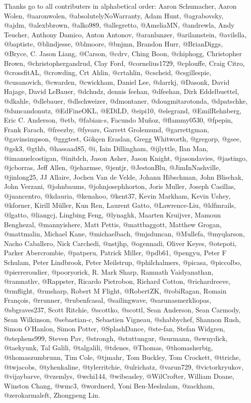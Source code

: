 Thanks go to all contributers in alphabetical order: Aaron Schumacher,
Aaron Wolen, @aaronwolen, @absolutelyNoWarranty, Adam Hunt, @agrabovsky,
@ajdm, @alexbbrown, @alko989, @allegretto, @AmeliaMN, @andrewla, Andy
Teucher, Anthony Damico, Anton Antonov, @aranlunzer, @arilamstein,
@avilella, @baptiste, @blindjesse, @blmoore, @bnjmn, Brandon Hurr,
@BrianDiggs, @Bryce, C. Jason Liang, @Carson, @cdrv, Ching Boon,
@chiphogg, Christopher Brown, @christophergandrud, Clay Ford,
@cornelius1729, @cplouffe, Craig Citro, @crossfitAL, @crowding, Crt
Ahlin, @crtahlin, @cscheid, @csgillespie, @cusanovich, @cwarden,
@cwickham, Daniel Lee, @darrkj, @Dasonk, David Hajage, David LeBauer,
@dchudz, dennis feehan, @dfeehan, Dirk Eddelbuettel, @dkahle, @dlebauer,
@dlschweizer, @dmontaner, @dougmitarotonda, @dpatschke, @duncandonutz,
@EdFineOKL, @EDiLD, @eipi10, @elegrand, @EmilRehnberg, Eric C. Anderson,
@etb, @fabian-s, Facundo Muñoz, @flammy0530, @fpepin, Frank Farach,
@freezby, @fyears, Garrett Grolemund, @garrettgman, @gavinsimpson,
@gggtest, Gökçen Eraslan, Gregg Whitworth, @gregorp, @gsee, @gsk3,
@gthb, @hassaad85, @i, Iain Dillingham, @ijlyttle, Ilan Man,
@imanuelcostigan, @initdch, Jason Asher, Jason Knight, @jasondavies,
@jastingo, @jcborras, Jeff Allen, @jeharmse, @jentjr, @JestonBlu,
@JimInNashville, @jinlong25, JJ Allaire, Jochen Van de Velde, Johann
Hibschman, John Blischak, John Verzani, @johnbaums, @johnjosephhorton,
Joris Muller, Joseph Casillas, @juancentro, @kdauria, @kenahoo, @kent37,
Kevin Markham, Kevin Ushey, @kforner, Kirill Müller, Kun Ren, Laurent
Gatto, @Lawrence-Liu, @ldfmrails, @lgatto, @liangcj, Lingbing Feng,
@lynaghk, Maarten Kruijver, Mamoun Benghezal, @mannyishere, Matt Pettis,
@mattbaggott, Matthew Grogan, @mattmalin, Michael Kane, @michaelbach,
@mjsduncan, @Mullefa, @myqlarson, Nacho Caballero, Nick Carchedi,
@nstjhp, @ogennadi, Oliver Keyes, @otepoti, Parker Abercrombie,
@patperu, Patrick Miller, @pdb61, @pengyu, Peter F Schulam, Peter
Lindbrook, Peter Meilstrup, @philchalmers, @picasa, @piccolbo,
@pierreroudier, @pooryorick, R. Mark Sharp, Ramnath Vaidyanathan,
@ramnathv, @Rappster, Ricardo Pietrobon, Richard Cotton, @richardreeve,
@rmflight, @rmsharp, Robert M Flight, @RobertZK, @robiRagan, Romain
François, @rrunner, @rubenfcasal, @sailingwave, @sarunasmerkliopas,
@sbgraves237, Scott Ritchie, @scottko, @scottl, Sean Anderson, Sean
Carmody, Sean Wilkinson, @sebastian-c, Sebastien Vigneau, @shabbychef,
Shannon Rush, Simon O'Hanlon, Simon Potter, @SplashDance, @ste-fan,
Stefan Widgren, @stephens999, Steven Pav, @strongh, @stuttungur,
@surmann, @swnydick, @taekyunk, Tal Galili, @talgalili, @tdenes,
@Thomas, @thomasherbig, @thomaszumbrunn, Tim Cole, @tjmahr, Tom Buckley,
Tom Crockett, @ttriche, @twjacobs, @tyhenkaline, @tylerritchie,
@ulrichatz, @varun729, @victorkryukov, @vijaybarve, @vzemlys, @wchi144,
@wibeasley, @WilCrofter, William Doane, Winston Chang, @wmc3, @wordnerd,
Yoni Ben-Meshulam, @zackham, @zerokarmaleft, Zhongpeng Lin.

